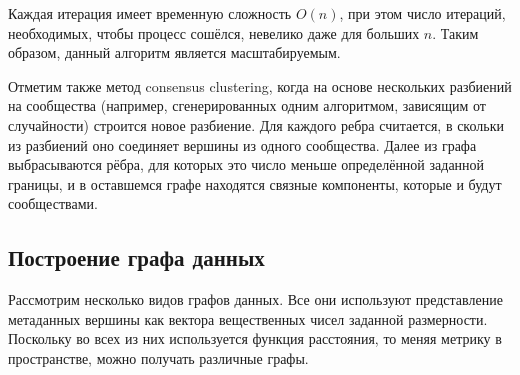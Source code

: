 \documentclass{article}
\begin{document}
Каждая итерация имеет временную сложность $O(n)$, при этом число итераций, необходимых, чтобы процесс сошёлся, невелико даже для больших $n$. Таким образом, данный алгоритм является масштабируемым.

Отметим также метод consensus clustering, когда на основе нескольких разбиений на сообщества (например, сгенерированных одним алгоритмом, зависящим от случайности) строится новое разбиение. Для каждого ребра считается, в скольки из разбиений оно соединяет вершины из одного сообщества. Далее из графа выбрасываются рёбра, для которых это число меньше определённой заданной границы, и в оставшемся графе находятся связные компоненты, которые и будут сообществами.

\subsection*{Построение графа данных}

Рассмотрим несколько видов графов данных. Все они используют представление метаданных вершины как вектора вещественных чисел заданной размерности. Поскольку во всех из них используется функция расстояния, то меняя метрику в пространстве, можно получать различные графы.
\end{document}
